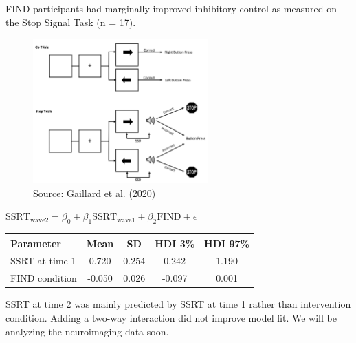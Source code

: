 \documentclass[final]{beamer}
\newlength{\colwidth}
\begin{document}
\begin{frame}[t]
\begin{columns}[t]
\begin{column}{\colwidth}
\begin{block}{FIND participants had marginally improved inhibitory control as measured on the Stop Signal Task (n = 17).}
    \begin{figure}[ht]
      \centering
      \includegraphics[clip, width=0.6\textwidth]{stopsignal.png}
        \\[0.5em]
        {\tiny Source: Gaillard et al. (2020)}
      \label{fig:stopsignal}
    \end{figure}

    \begin{tcolorbox}[colback=paloaltogreen, colframe=paloaltogreen, width=\linewidth]
     \color{white}
     $\text{SSRT}_{\text{wave2}} = \beta_0 + \beta_1 \text{SSRT}_{\text{wave1}} + \beta_2 \text{FIND} + \epsilon$
    \end{tcolorbox}
    
    \begin{table}[ht]
        \centering
        \fontsize{9}{11}\selectfont
          \begin{tabularx}{\textwidth}{l c c c c}
            \toprule
            \textbf{Parameter} & \textbf{Mean} & \textbf{SD} & \textbf{HDI 3\%} & \textbf{HDI 97\%} \\
            \midrule
            \rowcolor{yellow!50} SSRT at time 1 & 0.720 & 0.254 & 0.242 & 1.190 \\
            FIND condition & -0.050 & 0.026 & -0.097 & 0.001 \\
            \bottomrule
          \end{tabularx}
    \end{table}

    SSRT at time 2 was mainly predicted by SSRT at time 1 rather than intervention condition. Adding a two-way interaction did not improve model fit. We will be analyzing the neuroimaging data soon.
    
  \end{block}
    \vspace{-0.5cm}


\end{column}
\end{columns}
\end{frame}
\end{document}
